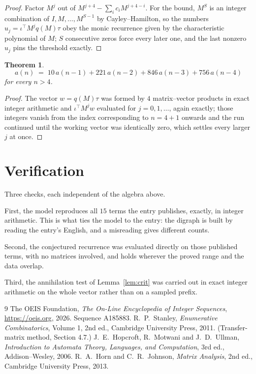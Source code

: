 \documentclass[11pt,a4paper]{article}
\theoremstyle{plain}
\newtheorem{theorem}{Theorem}
\theoremstyle{definition}
\begin{document}
\begin{proof}
Factor $M^{j}$ out of $M^{j+4}-\sum_ic_iM^{j+4-i}$. For the bound, $M^{S}$
is an integer combination of $I,M,\dots,M^{S-1}$ by Cayley--Hamilton, so the numbers
$u_j=\iota^{\!\top}M^{j}q(M)\tau$ obey the monic recurrence given by the characteristic
polynomial of $M$; $S$ consecutive zeros force every later one, and the last nonzero $u_j$
pins the threshold exactly.
\end{proof}

\begin{theorem}
\[
a(n)\;=\;10\,a(n-1) + 221\,a(n-2) + 846\,a(n-3) + 756\,a(n-4)
\]
for every $n>4$.
\end{theorem}

\begin{proof}
The vector $w=q(M)\tau$ was formed by $4$ matrix--vector products in exact integer
arithmetic and $\iota^{\!\top}M^{j}w$ evaluated for $j=0,1,\dots$, again exactly; those
integers vanish from the index corresponding to $n=4+1$ onwards and the run continued
until the working vector was identically zero, which settles every larger $j$ at once.
\end{proof}

\section{Verification}

Three checks, each independent of the algebra above.

First, the model reproduces all $15$ terms the entry publishes, exactly, in integer
arithmetic. This is what ties the model to the entry: the digraph is built by reading the
entry's English, and a misreading gives different counts.

Second, the conjectured recurrence was evaluated directly on those published terms, with no
matrices involved, and holds wherever the proved range and the data overlap.

Third, the annihilation test of Lemma~\ref{lem:crit} was carried out in exact integer
arithmetic on the whole vector rather than on a sampled prefix.

\begin{thebibliography}{9}
 The OEIS Foundation, \emph{The On-Line Encyclopedia of Integer
Sequences}, \url{https://oeis.org}, 2026. Sequence A185883.
 R.~P.~Stanley, \emph{Enumerative Combinatorics}, Volume 1, 2nd ed.,
Cambridge University Press, 2011. (Transfer-matrix method, Section 4.7.)
 J.~E.~Hopcroft, R.~Motwani and J.~D.~Ullman, \emph{Introduction to Automata
Theory, Languages, and Computation}, 3rd ed., Addison--Wesley, 2006.
 R.~A.~Horn and C.~R.~Johnson, \emph{Matrix Analysis}, 2nd ed., Cambridge
University Press, 2013.
\end{thebibliography}
\end{document}
